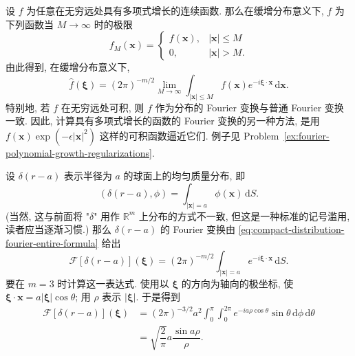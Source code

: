 \begin{Example}
\label{ex:fourier-polynomial-growth-truncation}
设 $f$ 为任意在无穷远处具有多项式增长的连续函数. 那么在缓增分布意义下, $f$ 为下列函数当 $M\to\infty$ 时的极限
\begin{equation}\label{eq:polynomial-growth-function-truncation}
f_M(\bm{x})=\begin{cases}f(\bm{x}),&|\bm{x}|\leq M\\0,&|\bm{x}|>M.\end{cases}
\end{equation}
由此得到, 在缓增分布意义下,
\begin{equation}\label{eq:polynomial-growth-fourier-truncation-limit}
\widehat f(\bm{\xi})=(2\pi)^{-m/2}\lim_{M\to\infty}\int_{|\bm{x}|\leq M}f(\bm{x})e^{-i\bm{\xi}\cdot\bm{x}}\,\mathrm{d}\bm{x}.
\end{equation}
特别地, 若 $f$ 在无穷远处可积, 则 $f$ 作为分布的 Fourier 变换与普通 Fourier 变换一致. 因此, 计算具有多项式增长的函数的 Fourier 变换的另一种方法, 是用 $f(\bm{x})\exp(-\epsilon|\bm{x}|^2)$ 这样的可积函数逼近它们. 例子见 Problem~\ref{ex:fourier-polynomial-growth-regularizations}.
\end{Example}

\begin{Example}
\label{ex:fourier-uniform-sphere-mass}
设 $\delta(r-a)$ 表示半径为 $a$ 的球面上的均匀质量分布, 即
\begin{equation}\label{eq:uniform-sphere-mass-pairing}
(\delta(r-a),\phi)=\int_{|\bm{x}|=a}\phi(\bm{x})\,\mathrm{d}S.
\end{equation}
(当然, 这与前面将 "$\delta$" 用作 $\mathbb{R}^m$ 上分布的方式不一致, 但这是一种标准的记号滥用, 读者应当逐渐习惯.) 那么 $\delta(r-a)$ 的 Fourier 变换由 \eqref{eq:compact-distribution-fourier-entire-formula} 给出
\begin{equation}\label{eq:uniform-sphere-mass-fourier-integral}
\mathcal{F}[\delta(r-a)](\bm{\xi})=(2\pi)^{-m/2}\int_{|\bm{x}|=a}e^{-i\bm{\xi}\cdot\bm{x}}\,\mathrm{d}S.
\end{equation}
要在 $m=3$ 时计算这一表达式. 使用以 $\bm{\xi}$ 的方向为轴向的极坐标, 使 $\bm{\xi}\cdot\bm{x}=a|\bm{\xi}|\cos\theta$; 用 $\rho$ 表示 $|\bm{\xi}|$. 于是得到
\begin{equation}\label{eq:uniform-sphere-mass-three-dimensional-fourier}
\begin{aligned}
\mathcal{F}[\delta(r-a)](\bm{\xi})
&=(2\pi)^{-3/2}a^2\int_0^\pi\int_0^{2\pi}e^{-ia\rho\cos\theta}\sin\theta\,\mathrm{d}\phi\,\mathrm{d}\theta\\
&=\sqrt{\dfrac2\pi}a\dfrac{\sin a\rho}\rho.
\end{aligned}
\end{equation}

\end{Example}

